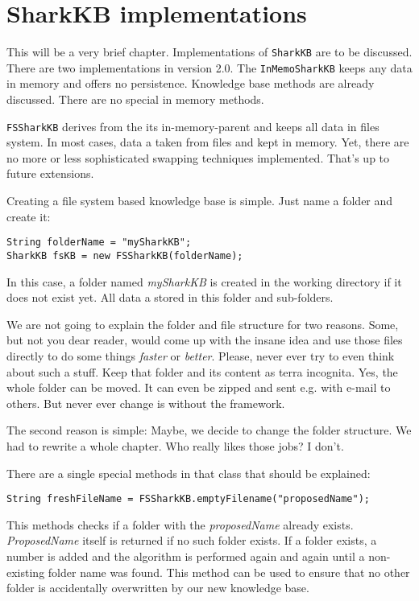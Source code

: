 \chapter{SharkKB implementations}
\label{sec:sharkkbimplementations}
This will be a very brief chapter. Implementations of {\tt SharkKB} are to be discussed. There are two implementations in version 2.0. The {\tt InMemoSharkKB} keeps any data in memory and offers no persistence. Knowledge base methods are already discussed. There are no special in memory methods.

{\tt FSSharkKB} derives from the its in-memory-parent and keeps all data in files system. In most cases, data a taken from files and kept in memory. Yet, there are no more or less sophisticated swapping techniques implemented. That's up to future extensions.

Creating a file system based knowledge base is simple. Just name a folder and create it:

\begin{verbatim}
String folderName = "mySharkKB";
SharkKB fsKB = new FSSharkKB(folderName);
\end{verbatim}

In this case, a folder named {\it mySharkKB} is created in the working directory if it does not exist yet. All data a stored in this folder and sub-folders. 

We are not going to explain the folder and file structure for two reasons. Some, but not you dear reader, would come up with the insane idea and use those files directly to do some things {\it faster} or {\it better}. Please, never ever try to even think about such a stuff. Keep that folder and its content as terra incognita. Yes, the whole folder can be moved. It can even be zipped and sent e.g. with e-mail to others. But never ever change is without the framework.

The second reason is simple: Maybe, we decide to change the folder structure. We had to rewrite a whole chapter. Who really likes those jobs? I don't.

There are a single special methods in that class that should be explained:

\begin{verbatim}
String freshFileName = FSSharkKB.emptyFilename("proposedName");
\end{verbatim}

This methods checks if a folder with the {\it proposedName} already exists. {\it ProposedName} itself is returned if no such folder exists. If a folder exists, a number is added and the algorithm is performed again and again until a non-existing folder name was found. This method can be used to ensure that no other folder is accidentally overwritten by our new knowledge base.
